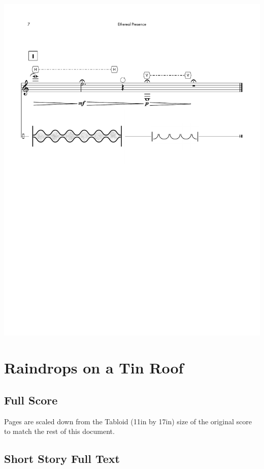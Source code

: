 \begin{center}
     \includegraphics[scale=0.75]{Scores/EPPart13.pdf}
\end{center}
\newpage

\section{Raindrops on a Tin Roof}

\subsection{Full Score}
Pages are scaled down from the Tabloid (11in by 17in) size of the original score to match the rest of this document. 

 

\subsection{Short Story Full Text}

